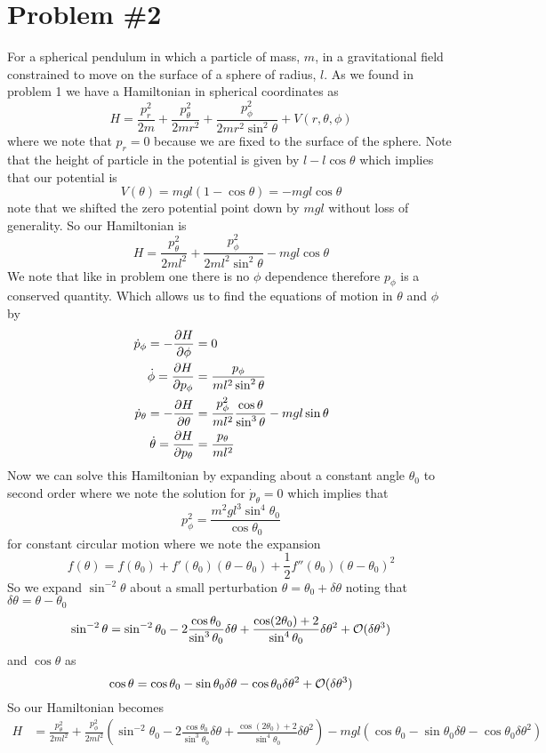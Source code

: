 \documentclass[11pt]{article}
\numberwithin{equation}{section}
\begin{document}
\section{Problem \#2}
For a spherical pendulum in which a particle of mass, $m$, in a gravitational field constrained
to move on the surface of a sphere of radius, $l$. As we found in problem 1 we have a 
Hamiltonian in spherical coordinates as
$$H = \frac{p_r^2}{2m} + \frac{p_{\theta}^2}{2mr^2} + \frac{p_{\phi}^2}{2mr^2\sin^2\theta} + V(r,\theta,\phi)$$
where we note that $p_r=0$ because we are fixed to the surface of the sphere. Note that the 
height of particle in the potential is given by $l-l\cos\theta$ which implies that our 
potential is
$$V(\theta) = mgl(1-\cos\theta) = -mgl\cos\theta$$
note that we shifted the zero potential point down by $mgl$ without loss of generality. So 
our Hamiltonian is 
$$H = \frac{p_{\theta}^2}{2ml^2} + \frac{p_{\phi}^2}{2ml^2\sin^2\theta} - mgl\cos\theta$$
We note that like in problem one there is no $\phi$ dependence therefore $p_{\phi}$ is a
conserved quantity. Which allows us to find the equations of motion in $\theta$ and $\phi$ by 
\begin{align*} 
\dot{p}_{\phi} = -\frac{\partial{H}}{\partial{\phi}} &= 0\\
\dot{\phi} =  \frac{\partial{H}}{\partial{p_{\phi}}} &= \frac{p_{\phi}}{ml^2\sin^2\theta}\\ 
\dot{p}_{\theta} = -\frac{\partial{H}}{\partial{\theta}} &= \frac{p_{\phi}^2}{ml^2}\frac{\cos\theta}{\sin^3\theta} - mgl\sin\theta\\
\dot{\theta} =  \frac{\partial{H}}{\partial{p_{\theta}}} &= \frac{p_{\theta}}{ml^2}
\end{align*} 
Now we can solve this Hamiltonian by expanding about a constant angle $\theta_0$ to second 
order where we note the solution for $\dot{p}_{\theta}=0$ which implies that
$$p_{\phi}^2 = \frac{m^2gl^3\sin^4\theta_0}{\cos\theta_0}$$
for constant circular motion
where we note the expansion
$$f(\theta) = f(\theta_0) + f'(\theta_0)(\theta-\theta_0) + \frac{1}{2}f''(\theta_0)(\theta-\theta_0)^2$$
So we expand $\sin^{-2}\theta$ about a small perturbation $\theta = \theta_0+\delta\theta$ 
noting that $\delta\theta = \theta-\theta_0$
$$\sin^{-2}\theta = \sin^{-2}\theta_0 - 2\frac{\cos\theta_0}{\sin^3\theta_0}\delta\theta + \frac{\cos(2\theta_0)+2}{\sin^4\theta_0}\delta\theta^2 + \mathcal{O}(\delta\theta^3)$$
and $\cos\theta$ as
$$\cos\theta = \cos\theta_0 - \sin\theta_0\delta\theta - \cos\theta_0\delta\theta^2 + \mathcal{O}(\delta\theta^3)$$
So our Hamiltonian becomes 
\begin{align*}
H &= \frac{p_{\theta}^2}{2ml^2} + \frac{p_{\phi}^2}{2ml^2}\left(\sin^{-2}\theta_0 - 2\frac{\cos\theta_0}{\sin^3\theta_0}\delta\theta + \frac{\cos(2\theta_0)+2}{\sin^4\theta_0}\delta\theta^2\right) - mgl(\cos\theta_0 - \sin\theta_0\delta\theta - \cos\theta_0\delta\theta^2)
\end{align*}
\end{document}
